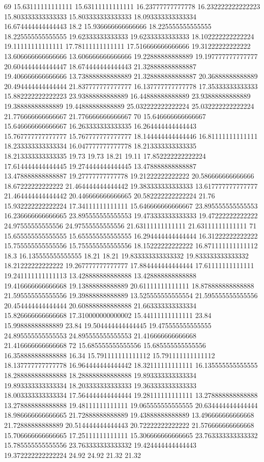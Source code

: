 69 15.63111111111111 15.63111111111111 16.23777777777778 16.232222222222223 15.803333333333333 15.803333333333333 18.093333333333334 16.674444444444443 18.2 15.936666666666666 18.225555555555555 18.225555555555555 19.62333333333333 19.62333333333333 18.102222222222224 19.11111111111111 17.78111111111111 17.516666666666666 19.31222222222222 13.606666666666666 13.606666666666666 19.22888888888889 19.197777777777777 20.604444444444447 18.674444444444443 21.328888888888887 19.406666666666666 13.738888888888889 21.328888888888887 20.36888888888889 20.494444444444444 21.837777777777777 16.137777777777778 17.35333333333333 15.882222222222223 23.93888888888889 16.44888888888889 23.93888888888889 19.38888888888889 19.44888888888889 25.032222222222224 25.032222222222224 21.776666666666667 21.776666666666667
70 15.646666666666667 15.646666666666667 16.263333333333335 16.264444444444443 15.767777777777777 15.767777777777777 18.144444444444446 16.81111111111111 18.233333333333334 16.047777777777778 18.213333333333335 18.213333333333335 19.73 19.73 18.21 19.11 17.852222222222224 17.614444444444445 19.274444444444445 13.478888888888887 13.478888888888887 19.27777777777778 19.21222222222222 20.586666666666666 18.67222222222222 21.464444444444442 19.383333333333333 13.617777777777777 21.464444444444442 20.446666666666665 20.582222222222224 21.76 15.932222222222224 17.34111111111111 15.646666666666667 23.895555555555553 16.236666666666665 23.895555555555553 19.473333333333333 19.47222222222222 24.97555555555556 24.97555555555556 21.63111111111111 21.63111111111111
71 15.655555555555555 15.655555555555555 16.294444444444444 16.31222222222222 15.755555555555556 15.755555555555556 18.15222222222222 16.871111111111112 18.3 16.135555555555555 18.21 18.21 19.833333333333332 19.833333333333332 18.21222222222222 19.267777777777777 17.884444444444444 17.61111111111111 19.241111111111113 13.428888888888888 13.428888888888888 19.416666666666668 19.13888888888889 20.61111111111111 18.878888888888888 21.595555555555556 19.39888888888889 13.525555555555554 21.595555555555556 20.454444444444444 20.608888888888888 21.663333333333334 15.826666666666668 17.310000000000002 15.44111111111111 23.84 15.99888888888889 23.84 19.504444444444445 19.475555555555555 24.895555555555553 24.895555555555553 21.416666666666668 21.416666666666668
72 15.685555555555556 15.685555555555556 16.358888888888888 16.34 15.791111111111112 15.791111111111112 18.137777777777778 16.964444444444442 18.32111111111111 16.135555555555555 18.288888888888888 18.288888888888888 19.893333333333334 19.893333333333334 18.203333333333333 19.363333333333333 18.003333333333334 17.564444444444444 19.28111111111111 13.278888888888888 13.278888888888888 19.48111111111111 19.065555555555555 20.634444444444444 18.986666666666665 21.72888888888889 19.43888888888889 13.496666666666668 21.72888888888889 20.514444444444443 20.72222222222222 21.576666666666668 15.706666666666665 17.25111111111111 15.306666666666665 23.763333333333332 15.785555555555556 23.763333333333332 19.424444444444443 19.372222222222224 24.92 24.92 21.32 21.32
